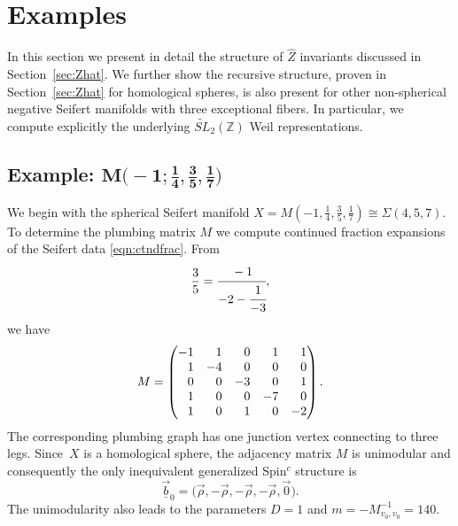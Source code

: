 \documentclass[10pt,a4paper]{amsart}
\def\wv{\vec{\rho}}
\newcommand{\ZZ}{\mathbb{Z}}
\theoremstyle{definition}
\numberwithin{equation}{section}
\begin{document}
\section{Examples}\label{sec:examples}
In this section we present in detail the structure of $\widehat{Z}$ invariants discussed in Section~\ref{sec:Zhat}. We further show the recursive structure, proven in Section~\ref{sec:Zhat} for homological spheres, is also present for other non-spherical negative Seifert manifolds with three exceptional fibers. In particular, we compute explicitly the underlying $\widetilde{SL}_2(\ZZ)$ Weil representations.

\subsection[Example: M(-1;1/4,3/5,1/7)]{Example: $\boldsymbol{ M\bigl(-1;\frac{1}{4},\frac{3}{5},\frac{1}{7}\bigr)}$}

We begin with the spherical Seifert manifold $X = M\left( -1,\frac{1}{4},\frac{3}{5},\frac{1}{7} \right)\cong\Sigma(4,5,7)$. To determine the plumbing matrix $M$ we compute continued fraction expansions of the Seifert data \eqref{eqn:ctndfrac}. From
\[
 \frac{3}{5}=\cfrac{-1}{-2-\cfrac{1}{-3}},
\]
we have
\begin{equation*}
 M=\left(
\begin{matrix}
 -1 & \hphantom{-}1 & \hphantom{-}0 & \hphantom{-}1 & \hphantom{-}1 \\
 \hphantom{-}1 & -4 & \hphantom{-}0 & \hphantom{-}0 & \hphantom{-}0 \\
 \hphantom{-}0 & \hphantom{-}0 & -3 & \hphantom{-}0 & \hphantom{-}1 \\
 \hphantom{-}1 & \hphantom{-}0 & \hphantom{-}0 & -7 & \hphantom{-}0 \\
 \hphantom{-}1 & \hphantom{-}0 & \hphantom{-}1 & \hphantom{-}0 & -2 \\
\end{matrix}
\right).
\end{equation*}
The corresponding plumbing graph has one junction vertex connecting to three legs. Since~$X$ is a homological sphere, the adjacency matrix $M$ is unimodular and consequently the only inequivalent generalized Spin$^c$ structure is
\[
\vec{\underline{b}}_{0}=\bigl( \wv,-\wv,-\wv,-\wv,\vec 0 \bigr).
\]
The unimodularity also leads to the parameters $D=1$ and $m=-M_{v_{0},v_{0}}^{-1}=140$.
\end{document}
